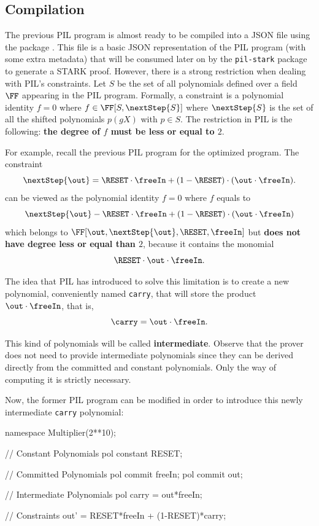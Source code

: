 \subsection{Compilation}

The previous PIL program is almost ready to be compiled into a JSON file using the \pilcom package \cite{pilcom}. This file is a basic JSON representation of the PIL program (with some extra metadata) that will be consumed later on by the \texttt{pil-stark} package \cite{pilstark} to generate a STARK proof. However, there is a strong restriction when dealing with PIL's constraints. Let $S$ be the set of all polynomials defined over a field $\FF$ appearing in the PIL program. Formally, a constraint is a polynomial identity $f = 0$ where $f \in \FF[S, \nextStep{S}]$ where $\nextStep{S}$ is the set of all the shifted polynomials $p(g X)$ with $p \in S$. The restriction in PIL is the following: \textbf{the degree of $f$ must be less or equal to $2$}.

For example, recall the previous PIL program for the optimized \Multiplier program. The constraint 
\[
\nextStep{\out} = \RESET \cdot \freeIn + (1 - \RESET) \cdot (\out \cdot \freeIn).
\]
can be viewed as the polynomial identity $f = 0$ where $f$ equals to
\[
\nextStep{\out} - \RESET \cdot \freeIn + (1 - \RESET) \cdot (\out \cdot \freeIn)
\]
which belongs to $\FF[\out, \nextStep{\out}, \RESET, \freeIn]$ but \textbf{does not have degree less or equal than $2$}, because it contains the monomial
\[
\RESET \cdot \out \cdot \freeIn.
\]

The idea that PIL has introduced to solve this limitation is to create a new polynomial, conveniently named \texttt{carry}, that will store the product $\out \cdot \freeIn$, that is,
\[
\carry = \out \cdot \freeIn.
\]

This kind of polynomials will be called \textbf{intermediate}. Observe that the prover does not need to provide intermediate polynomials since they can be derived directly from the committed and constant polynomials. Only the way of computing it is strictly necessary. 

Now, the former PIL program can be modified in order to introduce this newly intermediate \texttt{carry} polynomial:
\begin{pil}
namespace Multiplier(2**10);

    // Constant Polynomials
    pol constant RESET;

    // Committed Polynomials
    pol commit freeIn;
    pol commit out;

    // Intermediate Polynomials
    pol carry = out*freeIn;

    // Constraints
    out' = RESET*freeIn + (1-RESET)*carry;
\end{pil}

